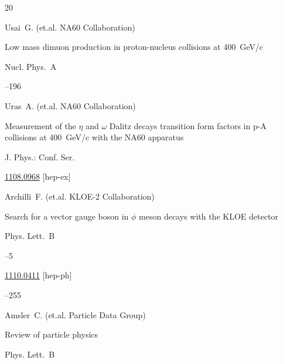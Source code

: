 \begin{thebibliography}{20}

\by Usai~G. (et.al. NA60 Collaboration)

\paper Low mass dimuon production in proton-nucleus collisions at 400~GeV/c

\jour Nucl. Phys.~A




--196





\by Uras~A. (et.al. NA60 Collaboration)

\paper Measurement of the $\eta$ and $\omega$ Dalitz decays transition form factors in p-A collisions at 400~GeV/c with the NA60 apparatus

\jour J. Phys.: Conf. Ser. 






\arxiv \href{http://arxiv.org/abs/1108.0968}{1108.0968} [hep-ex]




\by Archilli~F. (et.al. KLOE-2 Collaboration)


\paper  Search for a vector gauge boson in $\phi$ meson decays with the KLOE detector

\jour Phys. Lett.~B


--5

\arxiv \href{http://arxiv.org/abs/1110.0411}{1110.0411} [hep-ph]


--255




\by Amsler~C. (et.al. Particle Data Group)

\paper   Review of particle physics

\jour Phys. Lett.~B



\end{thebibliography}
